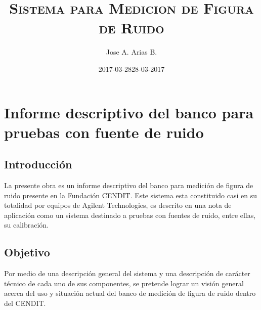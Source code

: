 \documentclass{article}
\title{}
\author{}
\date{2017-03-28}
\begin{document}
	\title{\textsc{Sistema para Medicion de Figura de Ruido}} 
	\author{Jose A. Arias B.}
	\date{28-03-2017}
	\maketitle
	\clearpage
	
	
	\tableofcontents
	
	\clearpage
	
	\section{Informe descriptivo del banco para pruebas con fuente de ruido}
	\subsection{Introducción}
	La presente obra es un informe descriptivo del banco para medición de figura de ruido presente en la Fundación CENDIT.
	Este sistema esta constituido casi en su totalidad por equipos de Agilent Technologies, es descrito en una nota de	aplicación como un sistema destinado a pruebas con fuentes de ruido, entre ellas, su calibración.
	
	\subsection{Objetivo}
	Por medio de una descripción general del sistema y una descripción de carácter técnico de cada uno de sus componentes, se pretende lograr un visión general acerca del uso y situación actual del banco de medición de figura de ruido dentro del CENDIT.
	
\end{document}
